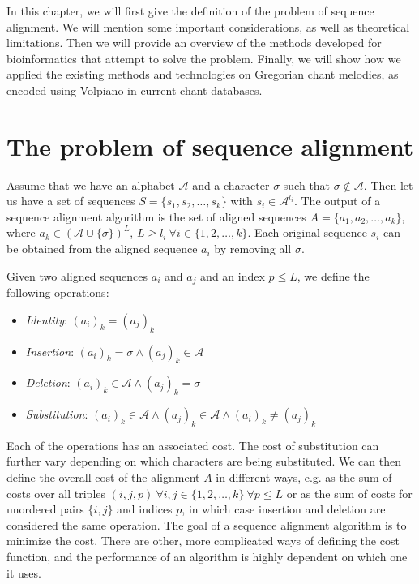 In this chapter, we will first give the definition of the problem of sequence alignment. We will mention some important considerations,
as well as theoretical limitations. Then we will provide an overview of the methods developed for bioinformatics that attempt to solve
the problem. Finally, we will show how we applied the existing methods and technologies on Gregorian chant melodies, as encoded
using Volpiano in current chant databases.

\section{The problem of sequence alignment}

Assume that we have an alphabet $\mathcal{A}$ and a character $\sigma$ such that $\sigma \notin \mathcal{A}$. Then let us have a set
of sequences $S = \{s_1, s_2, \dots, s_k\}$ with $s_i \in \mathcal{A}^{l_i}$. The output of a sequence alignment algorithm is the set of
aligned sequences $A = \{a_1, a_2, \dots, a_k\}$, where $a_k \in (\mathcal{A}\cup\{\sigma\})^L$, $L \geq l_i \:\forall i\in\{1, 2, \dots, k\}$.
Each original sequence $s_i$ can be obtained from the aligned sequence $a_i$ by removing all $\sigma$.

Given two aligned sequences $a_i$ and $a_j$ and an index $p \leq L$, we define the following operations:

\begin{itemize}
    \item \emph{Identity}: $(a_i)_k = (a_j)_k$
    \item \emph{Insertion}: $(a_i)_k = \sigma \land (a_j)_k \in \mathcal{A}$
    \item \emph{Deletion}: $(a_i)_k \in \mathcal{A} \land (a_j)_k = \sigma$
    \item \emph{Substitution}: $(a_i)_k \in \mathcal{A} \land (a_j)_k \in \mathcal{A} \land (a_i)_k \neq (a_j)_k$
\end{itemize}

Each of the operations has an associated cost. The cost of substitution can further vary depending on which characters are being
substituted. We can then define the overall cost of the alignment $A$ in different ways, e.g. as the sum of costs over all triples
$(i, j, p) \: \forall i, j \in \{1, 2, \dots, k\} \: \forall p \leq L$ or as the sum of costs for unordered pairs $\{i, j\}$ and indices $p$,
in which case insertion and deletion are considered the same operation. The goal of a sequence alignment algorithm is to minimize the cost.
There are other, more complicated ways of defining the cost  function, and the performance of an algorithm is highly dependent on which one it uses.

